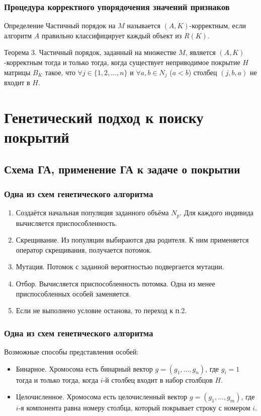 \documentclass[
	11pt,
]{beamer}
\begin{document}
\begin{frame}
	\frametitle{Процедура корректного упорядочения значений признаков}

	\begin{block}{Определение}
		Частичный порядок на $M$ называется $(A, K)$-корректным, если алгоритм $A$ правильно классифицирует каждый объект из $R(K)$.
	\end{block}

	\begin{block}{Теорема 3.}
		Частичный порядок, заданный на множестве $M$, является $(A, K)$-корректным тогда и только тогда, когда существует неприводимое покрытие $H$ матрицы $B_K$ такое, что $\forall j \in \{1, 2, ..., n\}$ и $\forall a, b \in N_j$ ($a < b$) столбец $(j, b, a)$ не входит в $H$.
	\end{block}
\end{frame}

\section{Генетический подход к поиску покрытий}

\subsection{Схема ГА, применение ГА к задаче о покрытии}

\begin{frame}
	\frametitle{Одна из схем генетического алгоритма}

	\begin{enumerate}
		\item Создаётся начальная популяция заданного объёма $N_p$. Для каждого индивида вычисляется приспособленность.
		\item Скрещивание. Из популяции выбираются два родителя. К ним применяется оператор скрещивания, получается потомок.
		\item Мутация. Потомок с заданной вероятностью подвергается мутации.
		\item Отбор. Вычисляется приспособленность потомка. Одна из менее приспособленных особей заменяется.
		\item Если не выполнено условие останова, то переход к п.2.
	\end{enumerate}
\end{frame}

\begin{frame}
	\frametitle{Одна из схем генетического алгоритма}

	Возможные способы представления особей:
	\begin{itemize}
		\item Бинарное. Хромосома есть бинарный вектор $g = (g_1, ..., g_n)$, где $g_i = 1$ тогда и только тогда, когда $i$-й столбец входит в набор столбцов $H$.
		\item Целочисленное. Хромосома есть целочисленный вектор $g = (g_1, ..., g_m)$, где $i$-я компонента равна номеру столбца, который покрывает строку с номером $i$.
	\end{itemize}
\end{frame}
\end{document}
